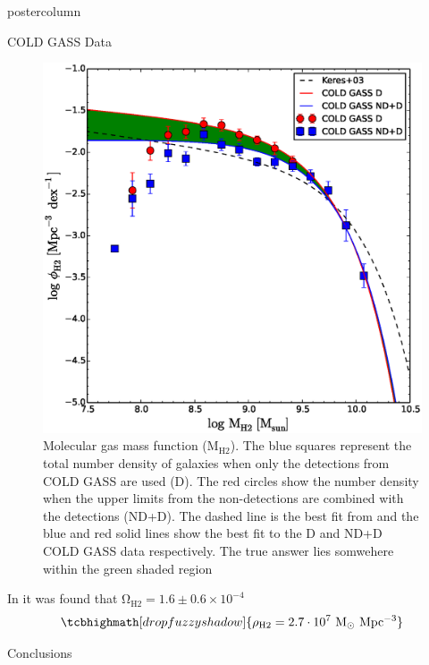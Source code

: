 \documentclass{beamer}
\begin{document}
\begin{frame}
\begin{columns}
\begin{column}{.5\textwidth}
\begin{beamercolorbox}[center,wd=\textwidth]{postercolumn}
\begin{minipage}[T]{.95\textwidth}
{\begin{myblock}{\LARGE COLD GASS Data}
						\begin{figure}[H]
						  \centering
						  \includegraphics[width=\textwidth]{img/MH2poster.eps}
						  \caption{Molecular gas mass function ($\mathrm{M_{H2}}$).
							The blue squares represent the total number density of galaxies
              when only the detections from COLD GASS are used (D). The red circles
              show the number density when the upper limits from the non-detections
              are combined with the detections (ND+D). The dashed line is the best fit
              from \cite{keres2003co} and the blue and red solid lines show the
              best fit to the D and ND+D COLD GASS data respectively. The true
              answer lies somwehere within the green shaded region}
						  \label{fig:CG}
						\end{figure}
            In \cite{keres2003co} it was found that
            $\mathrm{\Omega_{H2} = 1.6 \pm 0.6 \times 10^{-4}}$
						\begin{equation}
							\tcbhighmath[drop fuzzy shadow]{\mathrm{\rho_{H2} = 2.7 \cdot 10^{7} ~ M_{\odot}~ Mpc^{-3}}}
						\end{equation}
					\end{myblock}\vfill
\begin{myblock}{\LARGE Conclusions}
\end{myblock}\vfill
}
\end{minipage}
\end{beamercolorbox}
\end{column}
\end{columns}
\end{frame}
\end{document}
